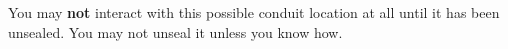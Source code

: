 \documentclass[white]{elementals}
\begin{document}
\name{\wSealedConduit{}}

You may {\bf not} interact with this possible conduit location at all until it has been unsealed. You may not unseal it unless you know how.
\end{document}
